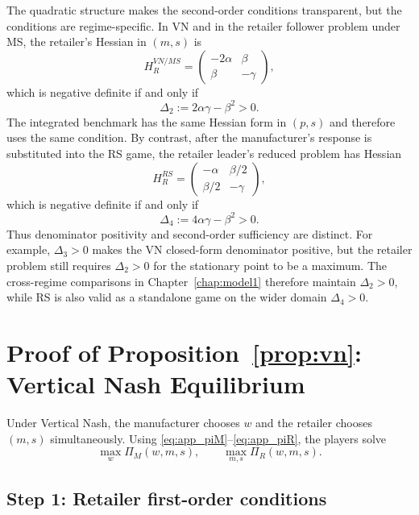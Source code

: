 The quadratic structure makes the second-order conditions transparent, but the
conditions are regime-specific. In VN and in the retailer follower problem under
MS, the retailer's Hessian in $(m,s)$ is
\begin{equation}
 H_R^{VN/MS}=
 \begin{pmatrix}
 -2\alpha & \beta\\
 \beta & -\gamma
 \end{pmatrix},
\end{equation}
which is negative definite if and only if
\begin{equation}
 \Delta_2:=2\alpha\gamma-\beta^2>0.
\end{equation}
The integrated benchmark has the same Hessian form in $(p,s)$ and therefore
uses the same condition. By contrast, after the manufacturer's response is
substituted into the RS game, the retailer leader's reduced problem has Hessian
\begin{equation}
 H_R^{RS}=
 \begin{pmatrix}
 -\alpha & \beta/2\\
 \beta/2 & -\gamma
 \end{pmatrix},
\end{equation}
which is negative definite if and only if
\begin{equation}
 \Delta_4:=4\alpha\gamma-\beta^2>0.
\end{equation}
Thus denominator positivity and second-order sufficiency are distinct. For
example, $\Delta_3>0$ makes the VN closed-form denominator positive, but the
retailer problem still requires $\Delta_2>0$ for the stationary point to be a
maximum. The cross-regime comparisons in Chapter~\ref{chap:model1} therefore
maintain $\Delta_2>0$, while RS is also valid as a standalone game on the wider
domain $\Delta_4>0$.

\section{Proof of Proposition~\ref{prop:vn}: Vertical Nash Equilibrium}
\label{app:proof_vn}

Under Vertical Nash, the manufacturer chooses $w$ and the retailer chooses
$(m,s)$ simultaneously. Using \eqref{eq:app_piM}--\eqref{eq:app_piR}, the
players solve
\begin{equation}
 \max_w \Pi_M(w,m,s),
 \qquad
 \max_{m,s}\Pi_R(w,m,s).
\end{equation}

\subsection{Step 1: Retailer first-order conditions}

